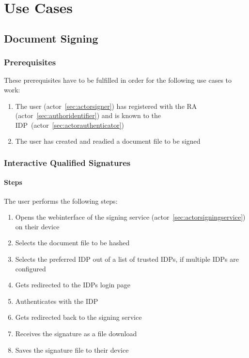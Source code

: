 \chapter{Use Cases}\label{ch:usecases}

\section{Document Signing}\label{sec:document-signing}

\subsection{Prerequisites}\label{subsec:prerequisites}
These prerequisites have to be fulfilled in order for the following use cases to work:
\begin{enumerate}
    \item The user (actor~\ref{sec:actorsigner}) has registered with the \gls{RA} (actor~\ref{sec:authoridentifier}) and is known to the \gls{IDP}~(actor~\ref{sec:actorauthenticator})
    \item The user has created and readied a document file to be signed
\end{enumerate}

\subsection{Interactive Qualified Signatures}\label{subsec:interactive-qualified-signatures}
\subsubsection{Steps}
The user performs the following steps:
\begin{enumerate}
    \item Opens the webinterface of the signing service (actor~\ref{sec:actorsigningservice}) on their device
    \item Selects the document file to be hashed
    \item Selects the preferred \gls{IDP} out of a list of trusted \gls{IDP}s, if multiple \gls{IDP}s are configured
    \item Gets redirected to the \gls{IDP}s login page
    \item Authenticates with the \gls{IDP}
    \item Gets redirected back to the signing service
    \item Receives the signature as a file download
    \item Saves the signature file to their device
\end{enumerate}

